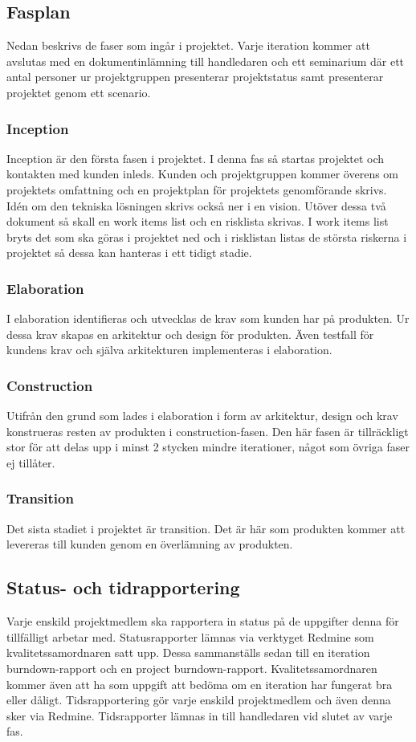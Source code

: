 \subsection{Fasplan}
Nedan beskrivs de faser som ingår i projektet. Varje iteration kommer att avslutas med en dokumentinlämning till handledaren och ett seminarium där ett antal personer ur projektgruppen presenterar projektstatus samt presenterar projektet genom ett scenario.

\subsubsection*{Inception}
Inception är den första fasen i projektet. I denna fas så startas projektet och kontakten med kunden inleds. Kunden och projektgruppen kommer överens om projektets omfattning och en projektplan för projektets genomförande skrivs. Idén om den tekniska lösningen skrivs också ner i en vision. Utöver dessa två dokument så skall en work items list och en risklista skrivas. I work items list bryts det som ska göras i projektet ned och i risklistan listas de största riskerna i projektet så dessa kan hanteras i ett tidigt stadie.

\subsubsection*{Elaboration}
I elaboration identifieras och utvecklas de krav som kunden har på produkten. Ur dessa krav skapas en arkitektur och design för produkten. Även testfall för kundens krav och själva arkitekturen implementeras i elaboration.

\subsubsection*{Construction}
Utifrån den grund som lades i elaboration i form av arkitektur, design och krav konstrueras resten av produkten i construction-fasen. Den här fasen är tillräckligt stor för att delas upp i minst 2 stycken mindre iterationer, något som övriga faser ej tillåter.

\subsubsection*{Transition}
Det sista stadiet i projektet är transition. Det är här som produkten kommer att levereras till kunden genom en överlämning av produkten.

\subsection{Status- och tidrapportering}
Varje enskild projektmedlem ska rapportera in status på de uppgifter denna för tillfälligt arbetar med. Statusrapporter lämnas via verktyget Redmine som kvalitetssamordnaren satt upp. Dessa sammanställs sedan till en iteration burndown-rapport och en project burndown-rapport. Kvalitetssamordnaren kommer även att ha som uppgift att bedöma om en iteration har fungerat bra eller dåligt.
Tidsrapportering gör varje enskild projektmedlem och även denna sker via Redmine. Tidsrapporter lämnas in till handledaren vid slutet av varje fas.

